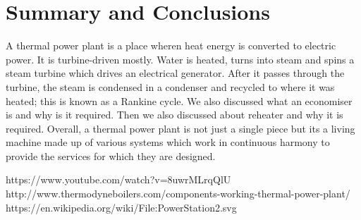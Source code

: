 \documentclass{report}
\begin{document}
\section{Summary and Conclusions}
A thermal power plant is a place wheren heat energy is converted to electric power. It is turbine-driven mostly. Water is heated, turns into steam and spins a steam turbine which drives an electrical generator. After it passes through the turbine, the steam is condensed in a condenser and recycled to where it was heated; this is known as a Rankine cycle. We also discussed what an economiser is and why is it required. Then we also discussed about reheater and why it is required. Overall, a thermal power plant is not just a single piece but its a living machine made up of various systems which work in continuous harmony to provide the services for which they are designed.

\begin{thebibliography}{999}
https://www.youtube.com/watch?v=8uwrMLrqQlU
http://www.thermodyneboilers.com/components-working-thermal-power-plant/
https://en.wikipedia.org/wiki/File:PowerStation2.svg
\end{thebibliography}
\end{document}
